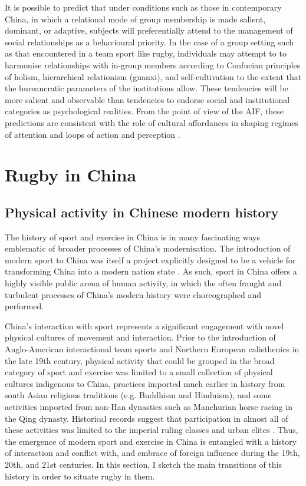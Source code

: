 \begin{CJK}{UTF8}{gbsn}
It is possible to predict that under conditions such as those in contemporary China, in which a relational mode of group membership is made salient, dominant, or adaptive, subjects will preferentially attend to the management of social relationships as a behavioural priority.  In the case of a group setting such as that encountered in a team sport like rugby, individuals may attempt to to harmonise relationships with in-group members according to Confucian principles of holism, hierarchical relationism (guanxi), and self-cultivation to the extent that the bureaucratic parameters of the institutions allow.  These tendencies will be more salient and observable than tendencies to endorse social and institutional categories as psychological realities. From the point of view of the AIF, these predictions are consistent with the role of cultural affordances in shaping regimes of attention and loops of action and perception \citep{Ramstead2016,Roepstorff2010}.







\section{Rugby in China}

\subsection{Physical activity in Chinese modern history}
The history of sport and exercise in China is in many fascinating ways emblematic of broader processes of China's modernisation.  The introduction of modern sport to China was itself a project explicitly designed to be a vehicle for transforming China into a modern nation state \citep{Morris2004}.  As such, sport in China offers a highly visible public arena of human activity, in which the often fraught and turbulent processes of China's modern history were choreographed and performed.

China's interaction with sport represents a significant engagement with novel physical cultures of movement and interaction.  Prior to the introduction of Anglo-American interactional team sports and Northern European calisthenics in the late 19th century, physical activity that could be grouped in the broad category of sport and exercise was limited to a small collection of physical cultures indigenous to China, practices imported much earlier in history from south Asian religious traditions (e.g. Buddhism and Hinduism), and some activities imported from non-Han dynasties such as Manchurian horse racing in the Qing dynasty.  Historical records suggest that participation in almost all of these activities was limited to the imperial ruling classes and urban elites \citep{Ge2005}.  Thus, the emergence of modern sport and exercise in China is entangled with a history of interaction and conflict with, and embrace of foreign influence during the 19th, 20th, and 21st centuries.  In this section, I sketch the main transitions of this history in order to situate rugby in them.


\end{CJK}
